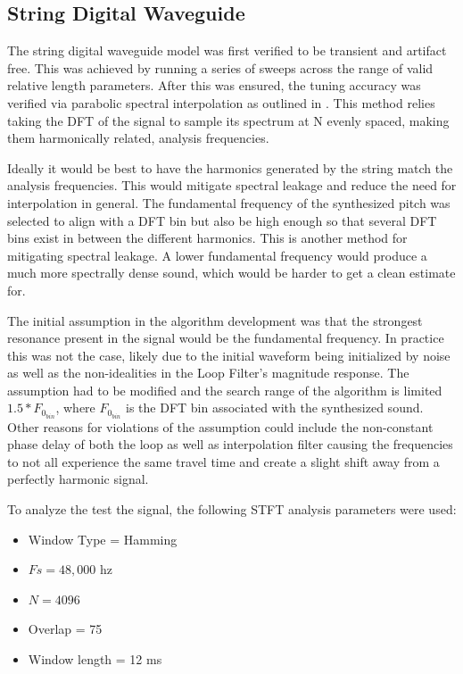 \documentclass[../main.tex]{subfiles}
\begin{document}
\subsection{String Digital Waveguide}
The string digital waveguide model was first verified to be transient and artifact free. This was achieved by running a series of sweeps across the range of valid relative length parameters. After this was ensured, the tuning accuracy was verified via parabolic spectral interpolation as outlined in . This method relies taking the DFT of the signal to sample its spectrum at N evenly spaced, making them  harmonically related, analysis frequencies.

Ideally it would be best to have the harmonics generated by the string match the analysis frequencies. This would mitigate spectral leakage and reduce the need for interpolation in general. The fundamental frequency of the synthesized pitch was selected to align with a DFT bin but also be high enough so that several DFT bins exist in between the different harmonics. This is another method for mitigating spectral leakage. A lower fundamental frequency would produce a much more spectrally dense sound, which would be harder to get a clean estimate for.

The initial assumption in the algorithm development was that the strongest resonance present in the signal would be the fundamental frequency. In practice this was not the case, likely due to the initial waveform being initialized by noise as well as the non-idealities in the Loop Filter's magnitude response. The assumption had to be modified and the search range of the algorithm is limited $1.5*F_0_{bin}$, where $F_0_{bin}$ is the DFT bin associated with the synthesized sound. Other reasons for violations of the assumption could include the non-constant phase delay of both the loop as well as interpolation filter causing the frequencies to not all experience the same travel time and create a slight shift away from a perfectly harmonic signal.

To analyze the test the signal, the following STFT analysis parameters were used:
\begin{itemize}
    \item Window Type = Hamming
    \item $Fs = 48,000$ hz
    \item $N = 4096$
    \item Overlap = 75%
    \item Window length = 12 ms
\end{itemize}
\end{document}
